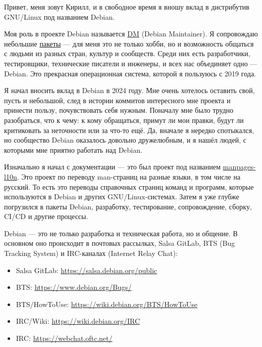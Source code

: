 Привет, меня зовут Кирилл, и в свободное время я вношу вклад в дистрибутив
GNU/Linux под названием Debian.

Моя роль в проекте Debian называется
\href{https://nm.debian.org/person/krekhov/}{DM} (Debian Maintainer).
Я сопровождаю небольшие
\href{https://qa.debian.org/developer.php?login=krekhov.dev@gmail.com}{пакеты}
--- для меня это не только хобби, но и возможность общаться с людьми из разных
стран, культур и сообществ. Среди них есть разработчики, тестировщики,
технические писатели и инженеры, и всех нас объединяет одно --- Debian. Это
прекрасная операционная система, которой я пользуюсь с 2019 года.

Я начал вносить вклад в Debian в 2024 году. Мне очень хотелось оставить свой,
пусть и небольшой, след в истории коммитов интересного мне проекта и принести
пользу, почувствовать себя нужным. Поначалу мне было трудно разобраться, что к
чему: к кому обращаться, примут ли мои правки, будут ли критиковать за
неточности или за что-то ещё. Да, вначале я нередко спотыкался, но сообщество
Debian оказалось довольно дружелюбным, и я нашёл людей, с которыми мне приятно
работать над Debian.

Изначально я начал с документации --- это был проект под названием
\href{https://salsa.debian.org/manpages-l10n-team/manpages-l10n}{manpages-l10n}.
Это проект по переводу man-страниц на разные языки, в том числе на русский. То
есть это переводы справочных страниц команд и программ, которые используются в
Debian и других GNU/Linux-системах. Затем я уже глубже погрузился в пакеты
Debian, разработку, тестирование, сопровождение, сборку, CI/CD и другие
процессы.

Debian --- это не только разработка и техническая работа, но и общение. В
основном оно происходит в почтовых рассылках, Salsa GitLab, BTS (Bug Tracking
System) и IRC-каналах (Internet Relay Chat):
\begin{itemize}
    \vspace{-0.3cm}
    \item Salsa GitLab: \url{https://salsa.debian.org/public}
    \item BTS: \url{https://www.debian.org/Bugs/}
    \item BTS/HowToUse: \url{https://wiki.debian.org/BTS/HowToUse}
    \item IRC/Wiki: \url{https://wiki.debian.org/IRC}
    \item IRC: \url{https://webchat.oftc.net/}
    \vspace{-0.3cm}
\end{itemize}

